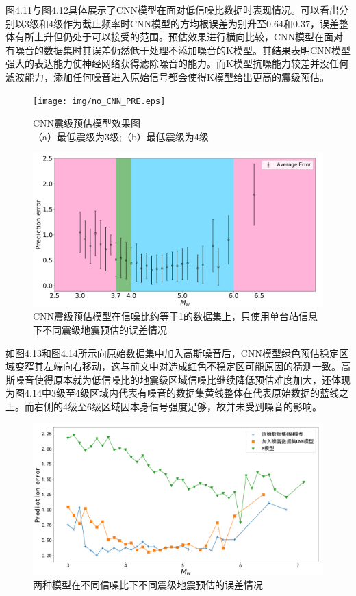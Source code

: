 \indent 图4.11与图4.12具体展示了CNN模型在面对低信噪比数据时表现情况。可以看出分别以3级和4级作为截止频率时CNN模型的方均根误差为别升至0.64和0.37，误差整体有所上升但仍处于可以接受的范围。预估效果进行横向比较，CNN模型在面对有噪音的数据集时其误差仍然低于处理不添加噪音的K模型。其结果表明CNN模型强大的表达能力使神经网络获得滤除噪音的能力。而K模型抗噪能力较差并没任何滤波能力，添加任何噪音进入原始信号都会使得K模型给出更高的震级预估。\\
\begin{figure}[!h]%
	\centering  %
	\texttt{[image: img/no\_CNN\_PRE.eps]}  %
	\caption{CNN震级预估模型效果图\\
（a）最低震级为3级;（b）最低震级为4级}  %
	\label{fig:mcmthesis-logo}   %
\end{figure}
\begin{figure}[!h]%
	\centering  %
	\includegraphics[width=\linewidth]{img/eb1_no_cnn.jpg}  %
	\caption{CNN震级预估模型在信噪比约等于1的数据集上，只使用单台站信息下不同震级地震预估的误差情况}  %
	\label{fig:mcmthesis-logo}   %
\end{figure}
\indent 如图4.13和图4.14所示向原始数据集中加入高斯噪音后，CNN模型绿色预估稳定区域变窄其左端向右移动，这与前文中对造成红色不稳定区可能原因的猜测一致。高斯噪音使得原本就为低信噪比的地震级区域信噪比继续降低预估难度加大，还体现为图4.14中3级至4级区域内代表有噪音的数据集黄线整体在代表原始数据的蓝线之上。而右侧的4级至6级区域因本身信号强度足够，故并未受到噪音的影响。\\
\begin{figure}[!h]%
	\centering  %
	\includegraphics[width=\linewidth]{img/model_comparison.jpg}  %
	\caption{两种模型在不同信噪比下不同震级地震预估的误差情况}  %
	\label{fig:mcmthesis-logo}   %
\end{figure}




